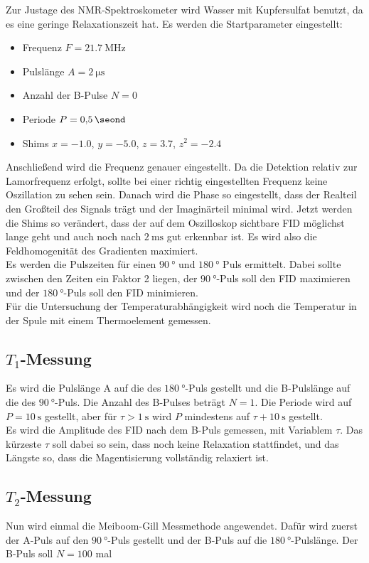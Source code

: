         \noindent Zur Justage des NMR-Spektroskometer wird Wasser mit Kupfersulfat benutzt, da es eine geringe Relaxationszeit hat. Es werden die Startparameter eingestellt: 
        \begin{itemize}
            \item Frequenz $F = \SI{21.7}{\mega\hertz}$
            \item Pulslänge $A = \SI{2}{\micro\second}$
            \item Anzahl der B-Pulse $N = \num{0}$ 
            \item Periode $P = \SI{0.5}{\seond}$ 
            \item Shims $x = \num{-1.0}$, $y = \num{-5.0}$, $z = \num{3.7}$, $z^2 = \num{-2.4}$
        \end{itemize}
        Anschließend wird die Frequenz genauer eingestellt. Da die Detektion relativ zur Lamorfrequenz erfolgt, sollte bei einer richtig eingestellten Frequenz keine Oszillation zu sehen sein. 
        Danach wird die Phase so eingestellt, dass der Realteil den Großteil des Signals trägt und der Imaginärteil minimal wird. Jetzt werden die Shims so verändert, dass der auf dem Oszilloskop 
        sichtbare FID möglichst lange geht und auch noch nach $\SI{2}{\milli\second}$ gut erkennbar ist. Es wird also die Feldhomogenität des Gradienten maximiert. \\
        Es werden die Pulszeiten für einen $\SI{90}{\degree}$ und $\SI{180}{\degree}$ Puls ermittelt. Dabei sollte zwischen den Zeiten ein Faktor 2 liegen, der $\SI{90}{\degree}$-Puls soll den 
        FID maximieren und der $\SI{180}{\degree}$-Puls soll den FID minimieren. \\
        Für die Untersuchung der Temperaturabhängigkeit wird noch die Temperatur in der Spule mit einem Thermoelement gemessen. 
        
    \subsection{$T_1$-Messung}

        \noindent Es wird die Pulslänge A auf die des $\SI{180}{\degree}$-Puls gestellt und die B-Pulslänge auf die des $\SI{90}{\degree}$-Puls. Die Anzahl des B-Pulses beträgt $N = 1$. Die Periode 
        wird auf $ P = \SI{10}{\second}$ gestellt, aber für $\tau > \SI{1}{\second}$ wird $P$ mindestens auf $\tau + \SI{10}{\second}$ gestellt.\\ 
        Es wird die Amplitude des FID nach dem B-Puls gemessen, mit Variablem $\tau$. Das kürzeste $\tau$ soll dabei so sein, dass noch keine Relaxation stattfindet, und das Längste so, dass die Magentisierung 
        vollständig relaxiert ist.  

    \subsection{$T_2$-Messung}

        \noindent Nun wird einmal die Meiboom-Gill Messmethode angewendet. Dafür wird zuerst der A-Puls auf den $\SI{90}{\degree}$-Puls gestellt und der B-Puls auf die $\SI{180}{\degree}$-Pulslänge. Der 
        B-Puls soll $N= \num{100}$ mal 